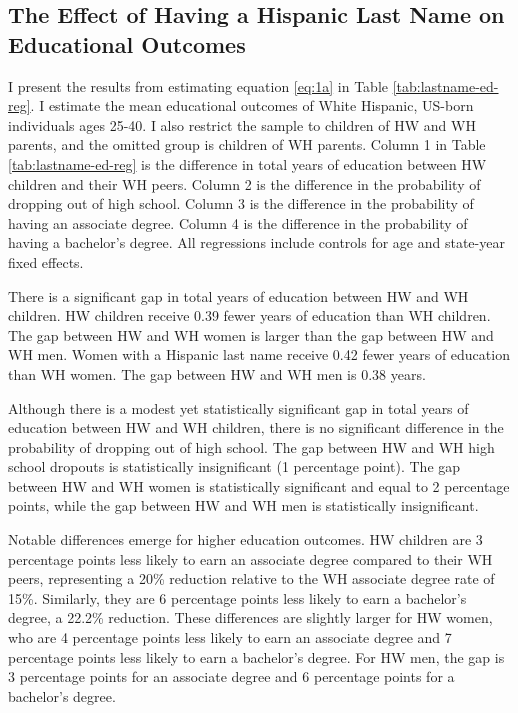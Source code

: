 \subsection{The Effect of Having a Hispanic Last Name on Educational Outcomes}

I present the results from estimating equation \ref{eq:1a} in Table \ref{tab:lastname-ed-reg}. I estimate the mean educational outcomes of White Hispanic, US-born individuals ages 25-40. I also restrict the sample to children of HW and WH parents, and the omitted group is children of WH parents. Column 1 in Table \ref{tab:lastname-ed-reg} is the difference in total years of education between HW children and their WH peers. Column 2 is the difference in the probability of dropping out of high school. Column 3 is the difference in the probability of having an associate degree. Column 4 is the difference in the probability of having a bachelor’s degree. All regressions include controls for age and state-year fixed effects.

There is a significant gap in total years of education between HW and WH children. HW children receive 0.39 fewer years of education than WH children. The gap between HW and WH women is larger than the gap between HW and WH men. Women with a Hispanic last name receive 0.42 fewer years of education than WH women. The gap between HW and WH men is 0.38 years.

Although there is a modest yet statistically significant gap in total years of education between HW and WH children, there is no significant difference in the probability of dropping out of high school. The gap between HW and WH high school dropouts is statistically insignificant (1 percentage point). The gap between HW and WH women is statistically significant and equal to 2 percentage points, while the gap between HW and WH men is statistically insignificant.

Notable differences emerge for higher education outcomes. HW children are 3 percentage points less likely to earn an associate degree compared to their WH peers, representing a 20\% reduction relative to the WH associate degree rate of 15\%. Similarly, they are 6 percentage points less likely to earn a bachelor's degree, a 22.2\% reduction. These differences are slightly larger for HW women, who are 4 percentage points less likely to earn an associate degree and 7 percentage points less likely to earn a bachelor’s degree. For HW men, the gap is 3 percentage points for an associate degree and 6 percentage points for a bachelor’s degree.

